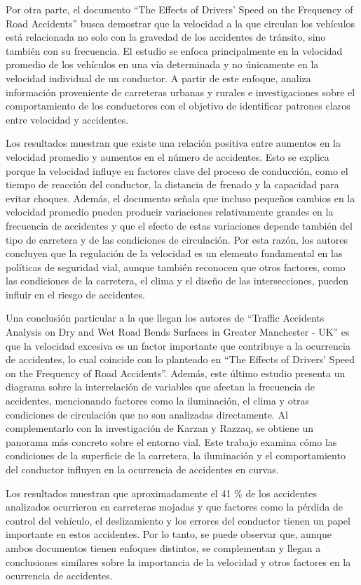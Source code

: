 \documentclass[12pt]{article}
\begin{document}
Por otra parte, el documento “The Effects of Drivers’ Speed on the Frequency of Road Accidents” busca demostrar que la velocidad a la que circulan los vehículos está relacionada no solo con la gravedad de los accidentes de tránsito, sino también con su frecuencia. El estudio se enfoca principalmente en la velocidad promedio de los vehículos en una vía determinada y no únicamente en la velocidad individual de un conductor. A partir de este enfoque, analiza información proveniente de carreteras urbanas y rurales e investigaciones sobre el comportamiento de los conductores con el objetivo de identificar patrones claros entre velocidad y accidentes.


Los resultados muestran que existe una relación positiva entre aumentos en la velocidad promedio y aumentos en el número de accidentes. Esto se explica porque la velocidad influye en factores clave del proceso de conducción, como el tiempo de reacción del conductor, la distancia de frenado y la capacidad para evitar choques. Además, el documento señala que incluso pequeños cambios en la velocidad promedio pueden producir variaciones relativamente grandes en la frecuencia de accidentes y que el efecto de estas variaciones depende también del tipo de carretera y de las condiciones de circulación. Por esta razón, los autores concluyen que la regulación de la velocidad es un elemento fundamental en las políticas de seguridad vial, aunque también reconocen que otros factores, como las condiciones de la carretera, el clima y el diseño de las intersecciones, pueden influir en el riesgo de accidentes.


Una conclusión particular a la que llegan los autores de “Traffic Accidents Analysis on Dry and Wet Road Bends Surfaces in Greater Manchester - UK” es que la velocidad excesiva es un factor importante que contribuye a la ocurrencia de accidentes, lo cual coincide con lo planteado en “The Effects of Drivers’ Speed on the Frequency of Road Accidents”. Además, este último estudio presenta un diagrama sobre la interrelación de variables que afectan la frecuencia de accidentes, mencionando factores como la iluminación, el clima y otras condiciones de circulación que no son analizadas directamente. Al complementarlo con la investigación de Karzan y Razzaq, se obtiene un panorama más concreto sobre el entorno vial. Este trabajo examina cómo las condiciones de la superficie de la carretera, la iluminación y el comportamiento del conductor influyen en la ocurrencia de accidentes en curvas.


Los resultados muestran que aproximadamente el 41 \% de los accidentes analizados ocurrieron en carreteras mojadas y que factores como la pérdida de control del vehículo, el deslizamiento y los errores del conductor tienen un papel importante en estos accidentes. Por lo tanto, se puede observar que, aunque ambos documentos tienen enfoques distintos, se complementan y llegan a conclusiones similares sobre la importancia de la velocidad y otros factores en la ocurrencia de accidentes.
\end{document}
